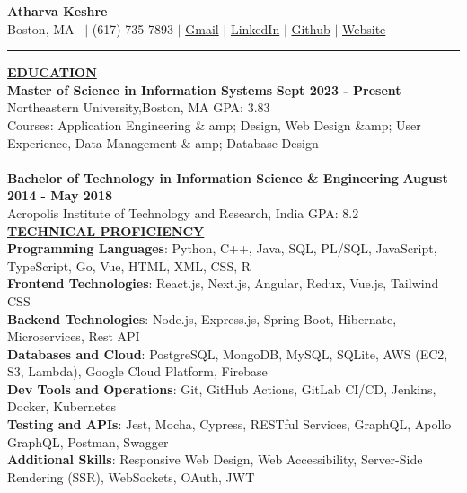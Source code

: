 \documentclass{article}
\begin{document}
\begin{center}
\thispagestyle{empty}
\large \textbf{\textbf{Atharva Keshre}  \\}
\normalsize  Boston, MA   $\mid$ (617) 735-7893 $\mid$ \href{mailto:keshre.a@northeastern.edu}{Gmail} $\mid$ \href{https://www.linkedin.com/in/atharva-keshre}{LinkedIn} $\mid$  \href{https://github.com/AtharvaKeshre}{Github} $\mid$  \href{https://atharvakeshre08.wixsite.com/website}{Website}  \\
\rule{\textwidth}{1pt}
\end{center}

\noindent \textbf{\underline{EDUCATION}} \\
\textbf{Master of Science in Information Systems} \hfill \textbf{Sept 2023 - Present } \\
Northeastern University,Boston, MA {GPA: 3.83}\\
Courses: Application Engineering \& amp; Design, Web Design \&amp; User Experience, Data Management \& amp; Database Design\\\\
\textbf{Bachelor of Technology in Information Science \& Engineering } \hfill \textbf{August 2014 - May 2018 } \\
Acropolis Institute of Technology and Research, India {GPA: 8.2} \\


\noindent \textbf{\underline{TECHNICAL PROFICIENCY}} \\
\textbf{Programming Languages}: Python, C++, Java, SQL, PL/SQL, JavaScript, TypeScript, Go, Vue, HTML, XML, CSS, R \\
\textbf{Frontend Technologies}: React.js, Next.js, Angular, Redux, Vue.js, Tailwind CSS \\
\textbf{Backend Technologies}: Node.js, Express.js, Spring Boot, Hibernate, Microservices, Rest API \\
\textbf{Databases and Cloud}: PostgreSQL, MongoDB, MySQL, SQLite, AWS (EC2, S3, Lambda), Google Cloud Platform, Firebase \\
\textbf{Dev Tools and Operations}: Git, GitHub Actions, GitLab CI/CD, Jenkins, Docker, Kubernetes \\
\textbf{Testing and APIs}: Jest, Mocha, Cypress, RESTful Services, GraphQL, Apollo GraphQL, Postman, Swagger \\
\textbf{Additional Skills}: Responsive Web Design, Web Accessibility, Server-Side Rendering (SSR), WebSockets, OAuth, JWT\\
\end{document}
